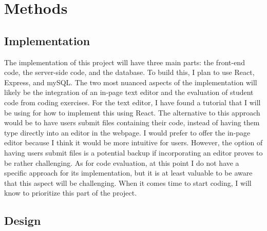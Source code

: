 \documentclass[10pt,twocolumn]{article}
\begin{document}
\section{Methods} 



\subsection{Implementation}

The implementation of this project will have three main parts: the front-end code, the server-side code, and the 
database. To build this, I plan to use React, Express, and mySQL. The two most nuanced aspects of the implementation 
will likely be the integration of an in-page text editor and the evaluation of student code from coding exercises. For the 
text editor, I have found a tutorial that I will be using for how to implement this using React. The alternative to this 
approach would be to have users submit files containing their code, instead of having them type directly into an editor 
in the webpage. I would prefer to offer the in-page editor because I think it would be more intuitive for users. 
However, the option of having users submit files is a potential backup if incorporating an editor proves to be rather 
challenging. As for code evaluation, at this point I do not 
have a specific approach for its implementation, but it is at least valuable to 
be aware that this aspect will be challenging. When it comes time to start coding, I will know to prioritize this part 
of the project. 

\subsection{Design}
\end{document}
